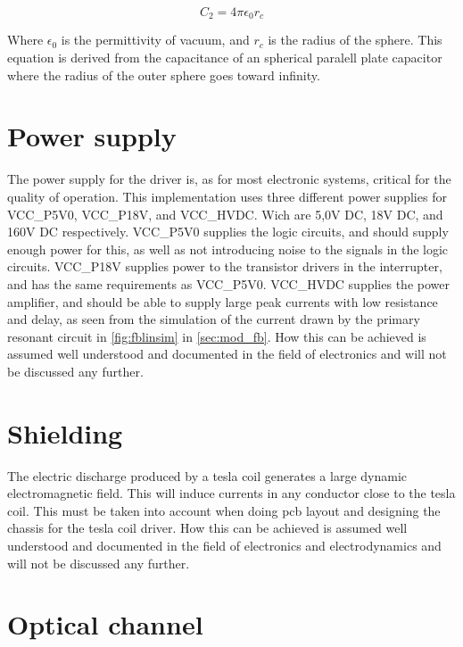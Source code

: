 \begin{equation} \label{eq:c2}
    C_2 = 4 \pi {\epsilon}_0 r_{c}
\end{equation}

Where ${\epsilon}_0$ is the permittivity of vacuum, and $r_c$ is the radius of the sphere. This equation is derived from the capacitance of an spherical paralell plate capacitor where the radius of the outer sphere goes toward infinity.


\section{Power supply}
The power supply for the driver is, as for most electronic systems, critical for the quality of operation. This implementation uses three different power supplies for VCC\_P5V0, VCC\_P18V, and VCC\_HVDC. Wich are 5,0V DC, 18V DC, and 160V DC respectively. VCC\_P5V0 supplies the logic circuits, and should supply enough power for this, as well as not introducing noise to the signals in the logic circuits. VCC\_P18V supplies power to the transistor drivers in the interrupter, and has the same requirements as VCC\_P5V0. VCC\_HVDC supplies the power amplifier, and should be able to supply large peak currents with low resistance and delay, as seen from the simulation of the current drawn by the primary resonant circuit in \cref{fig:fblinsim} in \cref{sec:mod_fb}. How this can be achieved is assumed well understood and documented in the field of electronics and will not be discussed any further.

\section{Shielding}
\label{sec:shielding}
The electric discharge produced by a tesla coil generates a large dynamic electromagnetic field. This will induce currents in any conductor close to the tesla coil. This must be taken into account when doing pcb layout and designing the chassis for the tesla coil driver. How this can be achieved is assumed well understood and documented in the field of electronics and electrodynamics and will not be discussed any further.

\section{Optical channel}
\label{sec:optical}

